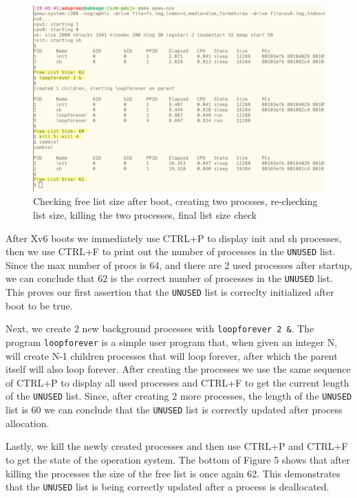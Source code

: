 \documentclass[11pt,letterpaper]{report}
\newcommand{\code}[1]{\colorbox{codegray}{\texttt{#1}}}
\begin{document}
{  \begin{figure}[h!]
	\centering
	\includegraphics[width=1\linewidth]{unused-list1.png}
	\caption[img]{Checking free list size after boot, creating two procsses, re-checking list size, killing the two processes, final list size check}
	\label{fig:P1compileP0-1}
  \end{figure}

  After Xv6 boots we immediately use CTRL+P to display init and sh processes, then we 
  use CTRL+F to print out the number of processes in the \code{UNUSED} list. Since the 
  max number of procs is 64, and there are 2 used processes after startup, we can conclude
  that 62 is the correct number of processes in the \code{UNUSED} list. This proves our
  first assertion that the \code{UNUSED} list is correclty initialized after boot to be true. 
  
  Next, we create 2 new background processes with \code{loopforever 2 \&}. 
  The program \code{loopforever} is a simple user program that, when given an integer N, will
  create N-1 children processes that will loop forever, after which the parent itself will also 
  loop forever. After creating the processes we use the same sequence of CTRL+P to display 
  all used processes and CTRL+F to get the current length of the \code{UNUSED} list. Since, 
  after creating 2 more processes, the length of the \code{UNUSED} list is 60 we can conclude
  that the \code{UNUSED} list is correctly updated after process allocation.

  Lastly, we kill the newly created processes and then use CTRL+P and CTRL+F to get the 
  state of the operation system. The bottom of Figure 5 shows that after killing the 
  processes the size of the free list is once again 62. This demonstrates that the 
  \code{UNUSED} list is being correctly updated after a process is deallocated. \\

}
\end{document}
